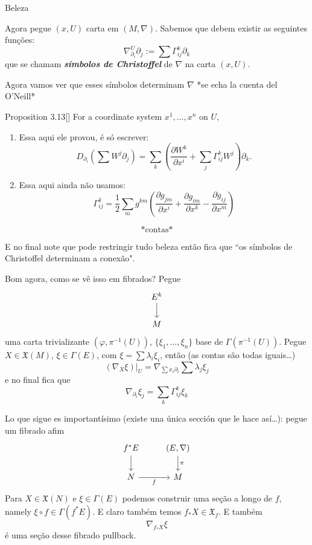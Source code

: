 Beleza

Agora pegue \((x,U)\) carta em  \((M,\nabla)\). Sabemos que debem existir as seguintes funções:
\[\nabla_{\partial_i}^U\partial_j:=\sum \Gamma_{ij}^k \partial_k\]
que se chamam \textit{\textbf{símbolos de Christoffel}} de \(\nabla\) na carta \((x,U)\).

Agora vamos ver que esses símbolos determinam \(\nabla\) *se echa la cuenta del O'Neill*
\begin{thing4}{Proposition 3.13}[\cite{oni}]\label{prop:3.13}\leavevmode
For a coordinate system \(x^1,\ldots,x^n\) on \(U\),
\begin{enumerate}
	\item {\color{7}Essa aqui ele provou, é só escrever:}\[D_{\partial_i}\left(\sum W^j\partial_j\right) =\sum_{k}\left(\frac{\partial W^k}{\partial x^i}+\sum_{j}\Gamma_{ij}^kW^j\right) \partial_k.\] 
	\item {\color{7}Essa aqui ainda não usamos:} \[\Gamma_{ij}^k=\frac{1}{2}\sum_{m}g^{km}\left(\frac{\partial g_{jm}}{\partial x^i}+\frac{\partial g_{im}}{\partial x^k}-\frac{\partial g_{ij}}{\partial x^m}\right) \]
	
\end{enumerate}
\end{thing4}
\[\text{*contas*} \]

E no final note que pode restringir tudo beleza então fica que ``os símbolos de Christoffel determinam a conexão".

Bom agora, como se vê isso em fibrados? Pegue
\[\begin{tikzcd}
E^k\arrow[d]\\
M
\end{tikzcd}\]
uma carta trivializante \((\varphi, \pi^{-1}(U))\), \(\{\xi_1,\ldots,\xi_n\}\) base de \(\Gamma(\pi^{-1}(U))\). Pegue \(X \in \mathfrak{X}(M)\), \(\xi \in \Gamma(E)\), com \(\xi=\sum \lambda_i\xi_i\), então (as contas são todas iguais…)
\[(\nabla_X \xi)|_{U}=\nabla_{\sum x_i \partial_i}\sum \lambda_j \xi_j\]
e no final fica que
\[\nabla_{\partial_i}\xi_j=\sum_k\Gamma_{ij}^k \xi_k\]

Lo que sigue es importantísimo (existe una única sección que le hace así…): pegue um fibrado afim
\[\begin{tikzcd}
f^*E\arrow[d]&(E,\nabla)\arrow[d,"\pi"]\\
N\arrow[r,"f",swap]&M
\end{tikzcd}\]
Para \(X \in \mathfrak{X}(N)\) e \(\xi \in \Gamma(E)\) podemos construir uma seção a longo de \(f\), namely \(\xi \circ f \in \Gamma(f^* E)\). E claro também temos \(f_*X \in \mathfrak{X}_f\). E também
\[\nabla_{f_*X}\xi\]
é uma seção desse fibrado pullback.


